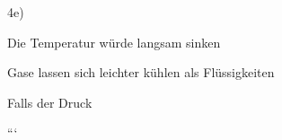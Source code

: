 4e)

Die Temperatur würde langsam sinken

Gase lassen sich leichter kühlen als Flüssigkeiten

Falls der Druck

```